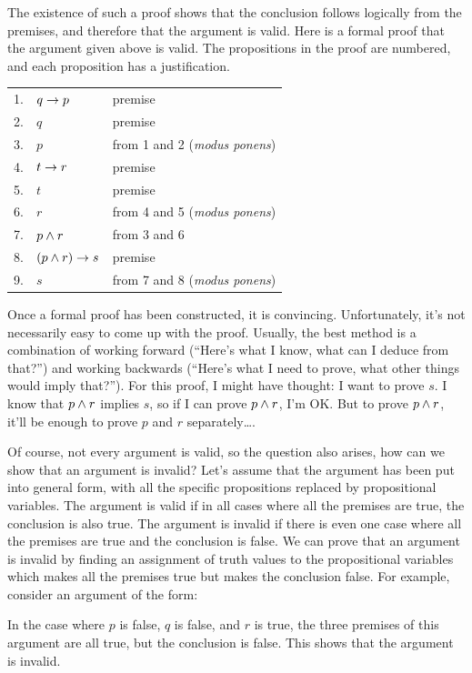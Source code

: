 The existence of such a proof shows that the conclusion follows
logically from the premises, and therefore that the argument is 
valid.  Here is a formal proof that the argument given above is valid.
The propositions in the proof are numbered, and each proposition
has a justification.
\begin{center}
  \begin{tabular}{r@{\ \ }l@{\qquad}l}
     1.&$q\rightarrow p$&    premise\\
     2.&$q$&          premise\\
     3.&$p$&          from 1 and 2 (\textit{modus ponens})\\
     4.&$t\rightarrow r$&    premise\\
     5.&$t$&          premise\\
     6.&$r$&          from 4 and 5 (\textit{modus ponens})\\
     7.&$p\wedge r$&    from 3 and 6\\
     8.&$(p\wedge r)\rightarrow s$& premise\\
     9.&$s$&          from 7 and 8 (\textit{modus ponens})\\
  \end{tabular}
\end{center}
Once a formal proof has been constructed, it is convincing.  Unfortunately,
it's not necessarily easy to come up with the proof.  Usually, the best
method is a combination of working forward (``Here's what I know, what
can I deduce from that?'') and working backwards (``Here's what I
need to prove, what other things would imply that?'').  For this proof,
I might have thought:  I want to prove $s$.  I know that
$p\wedge r$ implies $s$, so if I can prove $p\wedge r$, I'm OK.
But to prove $p\wedge r$, it'll be enough to prove $p$ and $r$ 
separately\dots.

Of course, not every argument is valid, so the question also
arises, how can we show that an argument is invalid?  Let's
assume that the argument has been put into general form, with
all the specific propositions replaced by propositional variables.
The argument is valid if in all cases where all the premises are
true, the conclusion is also true.  The argument is invalid if
there is even one case where all the premises are true and the
conclusion is false.  We can prove that an argument is invalid
by finding an assignment of truth values to the propositional variables
which makes all the premises true but makes the conclusion false.
For example, consider an argument of the form:
\begin{center}
\end{center}
In the case where $p$ is false, $q$ is false, and $r$ is true,
the three premises of this argument are all true, but the conclusion
is false.  This shows that the argument is invalid.


